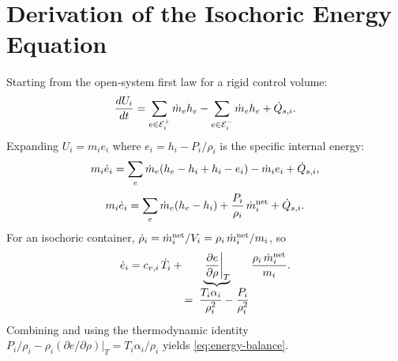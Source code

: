 \section{Derivation of the Isochoric Energy Equation}
\label{app:energy}

Starting from the open-system first law for a rigid control volume:
\begin{equation}
  \frac{dU_i}{dt} = \sum_{e \in \mathcal{E}_i^+} \dot{m}_e h_e
                  - \sum_{e \in \mathcal{E}_i^-} \dot{m}_e h_e + \dot{Q}_{s,i}.
\end{equation}
Expanding $U_i = m_i e_i$ where $e_i = h_i - P_i/\rho_i$ is the specific
internal energy:
\begin{equation}
  m_i \dot{e}_i = \sum_e \dot{m}_e (h_e - h_i + h_i - e_i)
                - \dot{m}_i e_i + \dot{Q}_{s,i},
\end{equation}
\begin{equation}
  m_i \dot{e}_i = \sum_e \dot{m}_e (h_e - h_i)
                + \frac{P_i}{\rho_i}\,\dot{m}_i^{\text{net}} + \dot{Q}_{s,i}.
\end{equation}
For an isochoric container, $\dot{\rho}_i = \dot{m}_i^{\text{net}}/V_i =
\rho_i\,\dot{m}_i^{\text{net}}/m_i$, so
\begin{equation}
  \dot{e}_i = c_{v,i}\,\dot{T}_i
            + \underbrace{\left.\frac{\partial e}{\partial\rho}\right|_{T}}_{\displaystyle
                =\;\frac{T_i\alpha_i}{\rho_i^2}-\frac{P_i}{\rho_i^2}}
            \frac{\rho_i\,\dot{m}_i^{\text{net}}}{m_i}.
\end{equation}
Combining and using the thermodynamic identity
$P_i/\rho_i - \rho_i(\partial e/\partial\rho)|_T = T_i\alpha_i/\rho_i$ yields
\cref{eq:energy-balance}.
